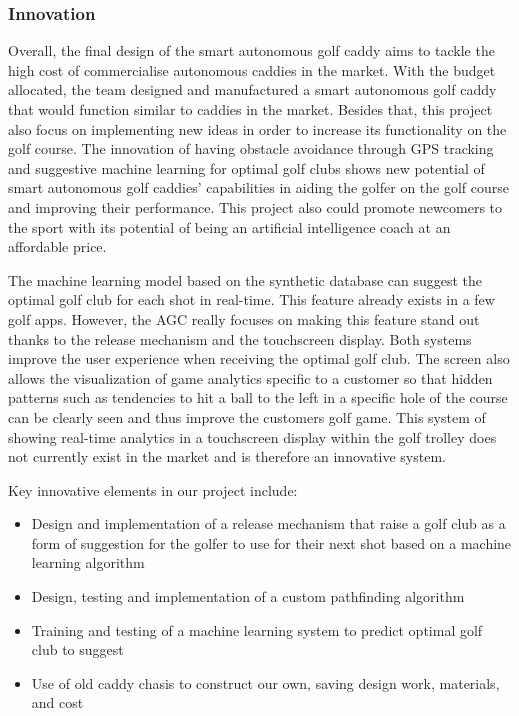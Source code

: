\documentclass[11pt,landscape]{article}
\begin{document}
\begin{multicols}{3}
\subsubsection{Innovation}
Overall, the final design of the smart autonomous golf caddy aims to tackle the
high cost of commercialise autonomous caddies in the market. With the budget
allocated, the team designed and manufactured a smart autonomous golf caddy that
would function similar to caddies in the market. Besides that, this project also
focus on implementing new ideas in order to increase its functionality on the
golf course. The innovation of having obstacle avoidance through GPS tracking
and suggestive machine learning for optimal golf clubs shows new potential of
smart autonomous golf caddies' capabilities in aiding the golfer on the golf
course and improving their performance. This project also could promote
newcomers to the sport with its potential of being an artificial intelligence
coach at an affordable price.

The machine learning model based on the synthetic database can suggest the
optimal golf club for each shot in real-time. This feature already exists in a
few golf apps. However, the AGC really focuses on making this feature stand out
thanks to the release mechanism and the touchscreen display. Both systems
improve the user experience when receiving the optimal golf club. The screen
also allows the visualization of game analytics specific to a customer so that
hidden patterns such as tendencies to hit a ball to the left in a specific hole
of the course can be clearly seen and thus improve the customers golf game. This
system of showing real-time analytics in a touchscreen display within the golf
trolley does not currently exist in the market and is therefore an innovative
system.

Key innovative elements in our project include:
\begin{itemize}
    \item Design and implementation of a release mechanism that raise a golf
    club as a form of suggestion for the golfer to use for their next shot based
    on a machine learning algorithm
    \item Design, testing and implementation of a custom pathfinding algorithm
    \item Training and testing of a machine learning system to predict optimal
    golf club to suggest
    \item Use of old caddy chasis to construct our own, saving design work,
    materials, and cost
\end{itemize}


\end{multicols}
\end{document}

